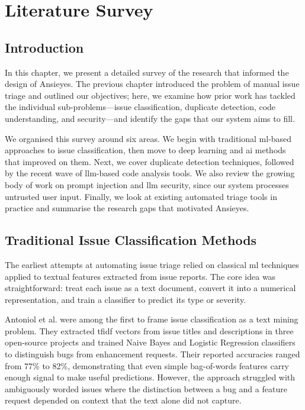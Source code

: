 \chapter{Literature Survey}

\section{\textbf{Introduction}}

In this chapter, we present a detailed survey of the research that informed the design of Ansieyes. The previous chapter introduced the problem of manual issue triage and outlined our objectives; here, we examine how prior work has tackled the individual sub-problems---issue classification, duplicate detection, code understanding, and security---and identify the gaps that our system aims to fill.

We organised this survey around six areas. We begin with traditional \gls{ml}-based approaches to issue classification, then move to deep learning and \gls{ai} methods that improved on them. Next, we cover duplicate detection techniques, followed by the recent wave of \gls{llm}-based code analysis tools. We also review the growing body of work on prompt injection and \gls{llm} security, since our system processes untrusted user input. Finally, we look at existing automated triage tools in practice and summarise the research gaps that motivated Ansieyes.

\section{\textbf{Traditional Issue Classification Methods}}

The earliest attempts at automating issue triage relied on classical \gls{ml} techniques applied to textual features extracted from issue reports. The core idea was straightforward: treat each issue as a text document, convert it into a numerical representation, and train a classifier to predict its type or severity.

Antoniol et al. \cite{Antoniol2008} were among the first to frame issue classification as a text mining problem. They extracted \gls{tfidf} vectors from issue titles and descriptions in three open-source projects and trained Naive Bayes and Logistic Regression classifiers to distinguish bugs from enhancement requests. Their reported accuracies ranged from 77\% to 82\%, demonstrating that even simple bag-of-words features carry enough signal to make useful predictions. However, the approach struggled with ambiguously worded issues where the distinction between a bug and a feature request depended on context that the text alone did not capture.

